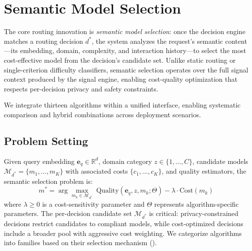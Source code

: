 
\section{Semantic Model Selection}
\label{sec:model_selection}

The core routing innovation is \emph{semantic model selection}: once the decision engine matches a routing decision $d^*$, the system analyzes the request's semantic content---its embedding, domain, complexity, and interaction history---to select the most cost-effective model from the decision's candidate set.
Unlike static routing or single-criterion difficulty classifiers, semantic selection operates over the full signal context produced by the signal engine, enabling cost-quality optimization that respects per-decision privacy and safety constraints.

We integrate thirteen algorithms within a unified interface, enabling systematic comparison and hybrid combinations across deployment scenarios.

\subsection{Problem Setting}

Given query embedding $\mathbf{e}_q \in \mathbb{R}^d$, domain category $z \in \{1, \ldots, C\}$, candidate models $\mathcal{M}_{d^*} = \{m_1, \ldots, m_K\}$ with associated costs $\{c_1, \ldots, c_K\}$, and quality estimators, the semantic selection problem is:
\begin{equation}
  m^* = \arg\max_{m_k \in \mathcal{M}_{d^*}} \; \text{Quality}(\mathbf{e}_q, z, m_k; \Theta) - \lambda \cdot \text{Cost}(m_k)
\end{equation}
where $\lambda \geq 0$ is a cost-sensitivity parameter and $\Theta$ represents algorithm-specific parameters.
The per-decision candidate set $\mathcal{M}_{d^*}$ is critical: privacy-constrained decisions restrict candidates to compliant models, while cost-optimized decisions include a broader pool with aggressive cost weighting.
We categorize algorithms into families based on their selection mechanism ().

